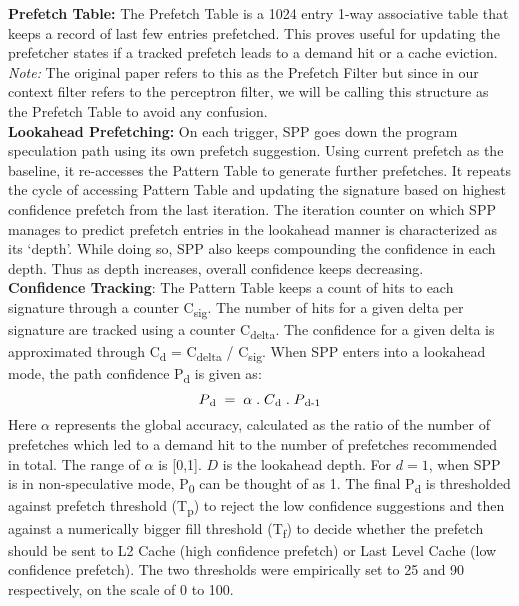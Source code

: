 \noindent \textbf{Prefetch Table:} The Prefetch Table is a 1024 entry 1-way associative
table that keeps a record of last few entries prefetched. This proves useful
for updating the prefetcher states if a tracked prefetch leads to a demand hit
or a cache eviction. \textit{Note:} The original paper refers to this as the
Prefetch Filter but since in our context filter refers to the perceptron
filter, we will be calling this structure as the Prefetch Table to avoid any
confusion.\\

\noindent \textbf{Lookahead Prefetching:} On each trigger, SPP goes down the program
speculation path using its own prefetch suggestion. Using current prefetch as
the baseline, it re-accesses the Pattern Table to generate further prefetches.
It repeats the cycle of accessing Pattern Table and updating the signature
based on highest confidence prefetch from the last iteration. The iteration
counter on which SPP manages to predict prefetch entries in the lookahead
manner is characterized as its `depth'. While doing so, SPP also keeps
compounding the confidence in each depth. Thus as depth increases, overall
confidence keeps decreasing.\\

\noindent \textbf{Confidence Tracking}: The Pattern Table keeps a count of hits to each
signature through a counter C\textsubscript{sig}. The number of hits for a
given delta per signature are tracked using a counter C\textsubscript{delta}.
The confidence for a given delta is approximated through C\textsubscript{d} =
C\textsubscript{delta} / C\textsubscript{sig}. When SPP enters into a
lookahead mode, the path confidence P\textsubscript{d} is given as:
$$P\textsubscript{d} \;=\; \alpha  \;.\;  C\textsubscript{d}  \;.\;
P\textsubscript{d-1}$$ Here $\alpha$ represents the global accuracy,
calculated as the ratio of the number of prefetches which led to a demand hit
to the number of prefetches recommended in total. The range of $\alpha$ is [0,1].
$D$ is the lookahead depth. For $d = 1$, when SPP is in
non-speculative mode, P\textsubscript{0} can be thought of as 1. 
The final P\textsubscript{d} is thresholded against prefetch threshold 
(T\textsubscript{p}) to reject the low confidence suggestions and 
then against a numerically bigger fill threshold (T\textsubscript{f}) to 
decide whether the prefetch should be sent to L2 Cache 
(high confidence prefetch) or Last Level Cache (low confidence prefetch).
The two thresholds were empirically set to 25 and 90 respectively, 
on the scale of 0 to 100. 

